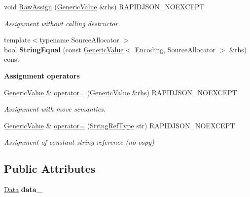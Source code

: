 \begin{DoxyCompactItemize}
void \hyperlink{a01992_abb8ea2dfbe74ff4ee7dac6be31317f81}{Raw\+Assign} (\hyperlink{a01992}{Generic\+Value} \&rhs) R\+A\+P\+I\+D\+J\+S\+O\+N\+\_\+\+N\+O\+E\+X\+C\+E\+PT
\begin{DoxyCompactList}\small\item\em Assignment without calling destructor. \end{DoxyCompactList}\item 
\mbox{\label{a01992_ad4d088dc601d99fea9d16300a7ec7ee1}} 
{\footnotesize template$<$typename Source\+Allocator $>$ }\\bool {\bfseries String\+Equal} (const \hyperlink{a01992}{Generic\+Value}$<$ Encoding, Source\+Allocator $>$ \&rhs) const
\end{DoxyCompactItemize}
\begin{Indent}\textbf{ Assignment operators}\par
\begin{DoxyCompactItemize}
\item 
\hyperlink{a01992}{Generic\+Value} \& \hyperlink{a01992_a9018a40d7c52efc00daf803c51d3236c}{operator=} (\hyperlink{a01992}{Generic\+Value} \&rhs) R\+A\+P\+I\+D\+J\+S\+O\+N\+\_\+\+N\+O\+E\+X\+C\+E\+PT
\begin{DoxyCompactList}\small\item\em Assignment with move semantics. \end{DoxyCompactList}\item 
\hyperlink{a01992}{Generic\+Value} \& \hyperlink{a01992_a386708557555e6389184de608af5e6a6}{operator=} (\hyperlink{a01992_a32e0f30ee278072374c8168b14d3317f}{String\+Ref\+Type} str) R\+A\+P\+I\+D\+J\+S\+O\+N\+\_\+\+N\+O\+E\+X\+C\+E\+PT
\begin{DoxyCompactList}\small\item\em Assignment of constant string reference (no copy) \end{DoxyCompactList}\end{DoxyCompactItemize}
\end{Indent}
\subsection*{Public Attributes}
\begin{DoxyCompactItemize}
\item 
\mbox{\label{a01992_aaf80f2c91d26fdde60b9edeeecd3509f}} 
\hyperlink{a02116}{Data} {\bfseries data\+\_\+}
\end{DoxyCompactItemize}
